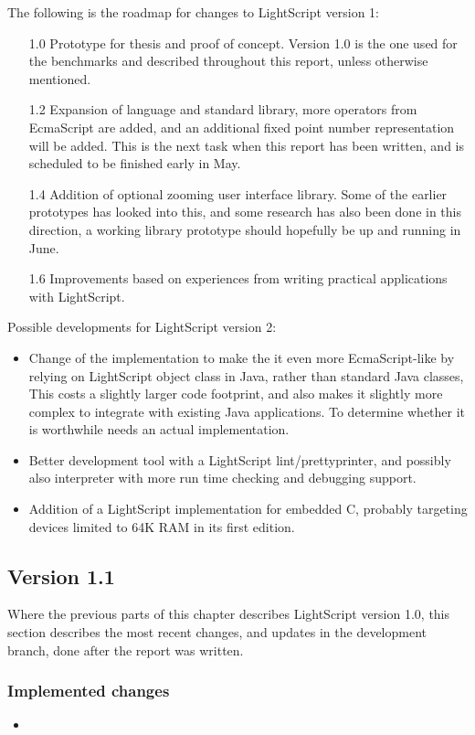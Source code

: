 \documentclass[11pt]{report}
\begin{document}
The following is the roadmap for changes to LightScript version 1:
\begin{itemize}
\item[1.0]
Prototype for thesis and proof of concept.
Version 1.0 is the one used for the benchmarks and described throughout this report, unless otherwise mentioned. 
\item[1.2]
Expansion of language and standard library, more operators from EcmaScript are added,
and an additional fixed point number representation will be added. 
This is the next task when this report has been written, and is scheduled to be finished early in May.
\item[1.4]
Addition of optional zooming user interface library. Some of the earlier prototypes has looked into this, and some research has also been done in this direction, a working library prototype should hopefully be up and running in June.
\item[1.6]
Improvements based on experiences from writing practical applications with LightScript.
\end{itemize}
Possible developments for LightScript version 2:
\begin{itemize}
\item
Change of the implementation to make the it even more EcmaScript-like by relying on LightScript object class in Java, rather than standard Java classes, This costs a slightly larger code footprint, and also makes it slightly more complex to integrate with existing Java applications.
To determine whether it is worthwhile needs an actual implementation.
\item
Better development tool with a LightScript lint/prettyprinter, and possibly also interpreter with more run time checking and debugging support.
\item
Addition of a LightScript implementation for embedded C, probably targeting devices limited to 64K RAM in its first edition. 
\end{itemize}

\subsection{Version 1.1}
Where the previous parts of this chapter describes LightScript version 1.0, this section describes the most recent changes, and updates in the development branch, done after the report was written.
\subsubsection{Implemented changes}
\begin{itemize}
\item
\end{itemize}
\end{document}
